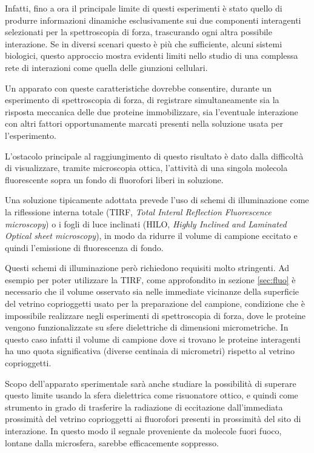 Infatti, fino a ora il principale limite di questi esperimenti è
stato quello di produrre informazioni dinamiche
esclusivamente sui due componenti interagenti selezionati per la
spettroscopia di forza, trascurando ogni altra possibile interazione.
Se in diversi scenari questo è più che sufficiente, alcuni
sistemi biologici, questo approccio mostra evidenti limiti nello
studio di una complessa rete di interazioni come quella delle
giunzioni cellulari.

Un apparato con queste caratteristiche dovrebbe consentire,
durante un esperimento di spettroscopia di forza, di registrare
simultaneamente sia la risposta meccanica delle due proteine
immobilizzare, sia l'eventuale interazione con altri fattori
opportunamente marcati presenti nella soluzione usata per
l'esperimento.

L'ostacolo principale al raggiungimento di questo risultato è dato
dalla difficoltà di visualizzare, tramite microscopia ottica,
l'attività di una singola molecola fluorescente sopra un fondo di
fluorofori liberi in soluzione.

Una soluzione tipicamente adottata prevede l'uso di schemi di
illuminazione come la riflessione interna totale
(TIRF, \textit{Total Interal Reflection Fluorescence microscopy})
o i fogli di luce inclinati
(HILO, \textit{Highly Inclined and Laminated Optical sheet
microscopy}),
in modo da ridurre il volume di campione eccitato e quindi l'emissione
di fluorescenza di fondo.

Questi schemi di illuminazione però richiedono requisiti molto
stringenti.
Ad esempio per poter utilizzare la TIRF, come approfondito in sezione
\ref{sec:fluo} è necessario che il volume osservato sia nelle
immediate vicinanze della superficie del vetrino
coprioggetti usato per la preparazione del campione,
condizione che è impossibile realizzare negli esperimenti di
spettroscopia di forza, dove le proteine vengono funzionalizzate su
sfere dielettriche di dimensioni micrometriche.
In questo caso infatti il volume di campione
dove si trovano le proteine interagenti ha uno quota significativa
(diverse centinaia di micrometri) rispetto al vetrino coprioggetti.

Scopo dell'apparato sperimentale sarà anche studiare la possibilità di
superare questo limite usando la sfera dielettrica come risuonatore
ottico, e quindi come strumento in grado di trasferire la radiazione
di eccitazione dall'immediata prossimità del vetrino coprioggetti ai
fluorofori presenti in prossimità del sito di interazione.
In questo modo il segnale proveniente da molecole fuori fuoco,
lontane dalla microsfera, sarebbe efficacemente soppresso.

